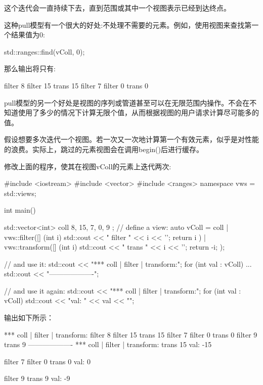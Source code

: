 这个迭代会一直持续下去，直到范围或其中一个视图表示已经到达终点。

这种pull模型有一个很大的好处:不处理不需要的元素。例如，使用视图来查找第一个结果值为0:

\begin{cpp}
std::ranges::find(vColl, 0);
\end{cpp}

那么输出将只有:

\begin{shell}
filter 8
filter 15
trans 15
filter 7
filter 0
trans 0
\end{shell}

pull模型的另一个好处是视图的序列或管道甚至可以在无限范围内操作。不会在不知道使用了多少的情况下计算无限个值，从而根据视图的用户请求计算尽可能多的值。


假设想要多次迭代一个视图。若一次又一次地计算第一个有效元素，似乎是对性能的浪费。实际上，跳过的元素视图会在调用begin()后进行缓存。

修改上面的程序，使其在视图vColl的元素上迭代两次:


\begin{cpp}
#include <iostream>
#include <vector>
#include <ranges>
namespace vws = std::views;

int main()
{
	std::vector<int> coll{ 8, 15, 7, 0, 9 };
	// define a view:
	auto vColl = coll
	| vws::filter([] (int i) {
		std::cout << " filter " << i << '\n';
		return i %
	})
	| vws::transform([] (int i) {
		std::cout << " trans " << i << '\n';
		return -i;
	});
	
	// and use it:
	std::cout << "*** coll | filter | transform:\n";
	for (int val : vColl) {
		...
	}
	std::cout << "-------------------\n";
	
	// and use it again:
	std::cout << "*** coll | filter | transform:\n";
	for (int val : vColl) {
		std::cout << "val: " << val << "\n\n";
	}
}
\end{cpp}

输出如下所示：

\begin{shell}
*** coll | filter | transform:
filter 8
filter 15
trans 15
filter 7
filter 0
trans 0
filter 9
trans 9
-------------------
*** coll | filter | transform:
trans 15
val: -15

filter 7
filter 0
trans 0
val: 0

filter 9
trans 9
val: -9
\end{shell}

